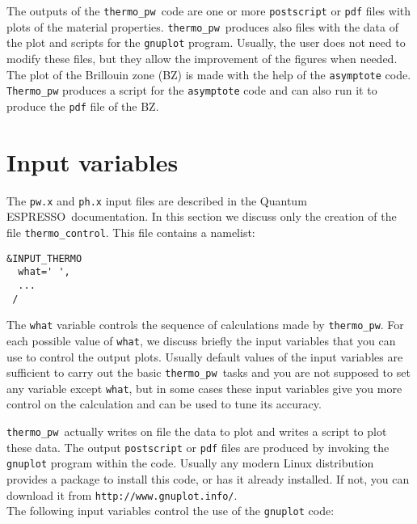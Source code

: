 \documentclass[12pt,a4paper]{article}
\def\qe{{\sc Quantum ESPRESSO}}
\def\thermo{\texttt{thermo\_pw}}
\begin{document}
The outputs of the \thermo\ code are one or more \texttt{postscript} or
\texttt{pdf} files 
with plots of the material properties. \thermo\ produces also files with 
the data of 
the plot and scripts for the \texttt{gnuplot} program. 
Usually, the user does not need to modify these files, but they allow 
the improvement of the figures when needed.
The plot of the Brillouin zone (BZ) is made with the help of the 
\texttt{asymptote} code. \texttt{Thermo\_pw} produces a script 
for the \texttt{asymptote} code and can also run it to produce the \texttt{pdf}
file of the BZ. 

\newpage

\section{\color{coral}Input variables}

The \texttt{pw.x} and \texttt{ph.x} input files are described in the \qe\ documentation.
In this section we discuss only the creation of the file
\texttt{thermo\_control}. This file contains a namelist:  
\begin{verbatim}
&INPUT_THERMO
  what=' ',
  ...
 /
\end{verbatim}
The \texttt{what} variable controls the sequence of calculations made
by \thermo. For each possible value of \texttt{what}, we discuss briefly the
input variables that you can use to control the output plots. Usually
default values of the input variables are sufficient to carry out  
the basic \thermo\ tasks and you are not supposed to set any variable except
\texttt{what}, but in some cases these input variables give you more control
on the calculation and can be used to tune its accuracy.

\thermo\ actually writes on file the data to plot and writes a script to plot
these data. The output \texttt{postscript} or \texttt{pdf} files are produced 
by invoking the 
\texttt{gnuplot} program within the code. Usually any modern Linux 
distribution provides a package to install this code, or has it already 
installed. If not, you can download it from 
\texttt{http://www.gnuplot.info/}. \\
The following input variables control the use of the \texttt{gnuplot} code:
\end{document}
